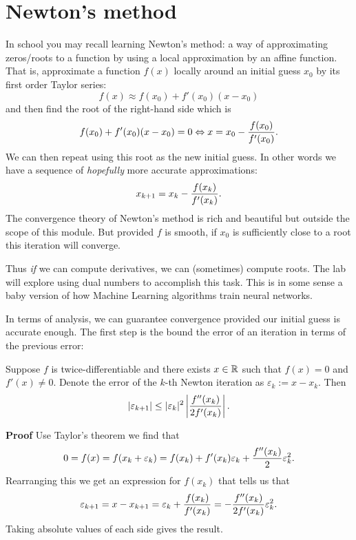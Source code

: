 
\section{Newton's method}
In school you may recall learning Newton's method: a way of approximating zeros/roots to a function by using a local approximation by an affine function. That is, approximate a function $f(x)$ locally around an initial guess $x_0$ by its first order Taylor series:
\[
f(x) \ensuremath{\approx} f(x_0) + f'(x_0) (x-x_0)
\]
and then find the root of the right-hand side which is
\[
 f(x_0) + f'(x_0) (x-x_0) = 0 \ensuremath{\Leftrightarrow} x = x_0 - {f(x_0) \over f'(x_0)}.
\]
We can then repeat using this root as the new initial guess. In other words we have a sequence of \emph{hopefully} more accurate approximations:
\[
x_{k+1} = x_k - {f(x_k) \over f'(x_k)}.
\]
The convergence theory of Newton's method is rich and beautiful but outside the scope of this module. But provided $f$ is smooth, if $x_0$ is sufficiently close to a root this iteration will converge. 

Thus \emph{if} we can compute derivatives, we can (sometimes) compute roots. The lab will explore using dual numbers to accomplish this task. This is in some sense a baby version of how Machine Learning algorithms train neural networks.

In terms of analysis, we can guarantee convergence provided our initial guess is accurate enough. The first step is the bound the error of an iteration in terms of the previous error:

\begin{theorem} Suppose $f$ is twice-differentiable and there exists  $x \in {\mathbb R}$ such that $f(x) = 0$ and $f'(x) \ensuremath{\neq} 0$. Denote the error of the $k$-th Newton iteration as $\ensuremath{\varepsilon}_k := x - x_k$. Then
\[
|\ensuremath{\varepsilon}_{k+1}| \ensuremath{\leq} |\ensuremath{\varepsilon}_k|^2 \left| {f''(x_k) \over 2f'(x_k)} \right|.
\]
\end{theorem}
\textbf{Proof} Use Taylor's theorem we find that
\[
0 = f(x) = f(x_k + \ensuremath{\varepsilon}_k) = f(x_k) + f'(x_k) \ensuremath{\varepsilon}_k + {f''(x_k) \over 2} \ensuremath{\varepsilon}_k^2.
\]
Rearranging this we get an expression for $f(x_k)$ that tells us that
\[
\ensuremath{\varepsilon}_{k+1} = x - x_{k+1} = \ensuremath{\varepsilon}_k +  {f(x_k) \over f'(x_k)} = -{f''(x_k) \over 2f'(x_k)} \ensuremath{\varepsilon}_k^2.
\]
Taking absolute values of each side gives the result.

